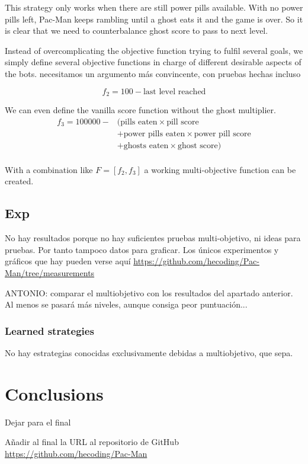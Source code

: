 \documentclass{llncs}
\newcommand{\paco}{Pac-Man }
\begin{document}
This strategy only works when there are still power pills available. With no power pills left, \paco keeps rambling until a ghost eats it and the game is over. So it is clear that we need to counterbalance ghost score to pass to next level.

Instead of overcomplicating the objective function trying to fulfil several goals, we simply define several objective functions in charge of different desirable aspects of the bots.
{\color{red} necesitamos un argumento más convincente, con pruebas hechas incluso}

\begin{equation}
f_2 = 100 - \text{last level reached}
\end{equation}

We can even define the vanilla score function without the ghost multiplier.
\begin{equation}
\begin{split}
f_3 = 100000 - & (\text{pills eaten} \times \text{pill score} \\
& + \text{power pills eaten} \times \text{power pill score} \\
& + \text{ghosts eaten} \times \text{ghost score}) \\
\end{split}
\end{equation}

With a combination like $F = [f_2, f_3]$ a working multi-objective function can be created.

\subsection{Exp}
{\color{red} No hay resultados porque no hay suficientes pruebas multi-objetivo, ni ideas para pruebas. Por tanto tampoco datos para graficar. Los únicos experimentos y gráficos que hay pueden verse aquí \url{https://github.com/hecoding/Pac-Man/tree/measurements}}

{\color{red}ANTONIO: comparar el multiobjetivo con los resultados del apartado anterior. Al menos se pasará más niveles, aunque consiga peor puntuación...}

\subsubsection{Learned strategies}
{\color{red}No hay estrategias conocidas exclusivamente debidas a multiobjetivo, que sepa.}

%
\section{Conclusions}
\label{sec:conclusions}
%


Dejar para el final

Añadir al final la URL al repositorio de GitHub
\url{https://github.com/hecoding/Pac-Man}



\end{document}
